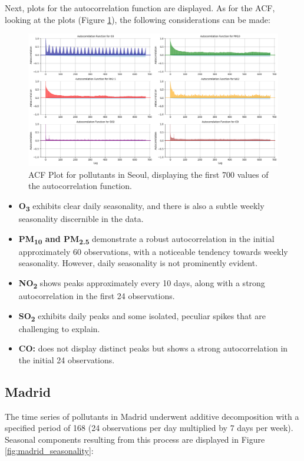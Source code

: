 Next, plots for the autocorrelation function are displayed. As for the ACF, looking at the plots (Figure \ref{fig:acfplot_seoul}), the following considerations can be made:

\begin{figure}[h]
    \centering
    \includegraphics[width=1\linewidth]{images/acfplot_seoul.png}
    \caption{ACF Plot for pollutants in Seoul, displaying the first 700 values of the autocorrelation function.}
    \label{fig:acfplot_seoul}
\end{figure}

\begin{itemize}[noitemsep]
    \item \textbf{O\textsubscript{3}} exhibits clear daily seasonality, and there is also a subtle weekly seasonality discernible in the data.
    \item \textbf{PM\textsubscript{10} and PM\textsubscript{2.5}} demonstrate a robust autocorrelation in the initial approximately 60 observations, with a noticeable tendency towards weekly seasonality. However, daily seasonality is not prominently evident.
    \item \textbf{NO\textsubscript{2}} shows peaks approximately every 10 days, along with a strong autocorrelation in the first 24 observations.
    \item \textbf{SO\textsubscript{2}} exhibits daily peaks and some isolated, peculiar spikes that are challenging to explain.
    \item \textbf{CO:} does not display distinct peaks but shows a strong autocorrelation in the initial 24 observations.
\end{itemize}

\subsection{Madrid}
The time series of pollutants in Madrid underwent additive decomposition with a specified period of 168 (24 observations per day multiplied by 7 days per week). Seasonal components resulting from this process are displayed in Figure \ref{fig:madrid_seasonality}:


